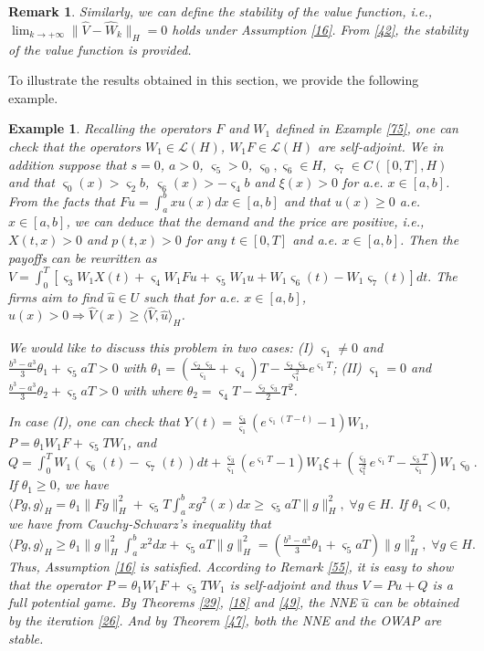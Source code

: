 \documentclass[10pt]{article}
\newtheorem{remark}{Remark}[section]
\newtheorem{example}{Example}[section]
\begin{document}
\begin{remark}\label{90}
Similarly, we can define the stability of the value function, i.e., $\lim_{k\rightarrow+\infty}\|\widehat{V}-\widehat{W}_k\|_H=0$ holds under Assumption \ref{16}. From \eqref{42}, the stability of the value function is provided.
\end{remark}
To illustrate  the results obtained in this section, we provide the following example.
\begin{example}\label{67}
Recalling the operators $F$ and $W_1$ defined in Example \ref{75}, one can check that the operators $W_1\in\mathcal{L}(H)$, $W_1F\in \mathcal{L}(H)$ are self-adjoint. We in addition suppose that $s=0$, $a>0$, $\varsigma_5>0$, $\varsigma_0,\varsigma_6\in H$, $\varsigma_7\in C([0,T],H)$ and that
$\varsigma_0(x)>\varsigma_2b$, $\varsigma_6(x)>-\varsigma_4b$  and $\xi(x)>0$ for a.e. $x\in[a,b]$.
From  the facts that $Fu=\int_a^bxu(x)dx\in[a,b]$ and that $u(x)\geq0$ a.e. $x\in[a,b]$, we can deduce that the demand and the price are positive, i.e.,
$X(t,x)>0$ and $p(t,x)>0$ for any  $t\in[0,T]$ and a.e.  $x\in[a,b]$. Then the payoffs can be rewritten as
$V=\int_0^T[\varsigma_3W_1X(t)+\varsigma_4W_1Fu+\varsigma_5W_1u+W_1\varsigma_6(t)-W_1\varsigma_7(t)]dt.$
The firms aim to find $\widehat{u} \in U$  such  that for a.e. $x\in[a,b]$, $\widehat{u}(x)>0\Rightarrow\widehat{V}(x)\geq\langle\widehat{V},\widehat{u}\rangle_{H}$.

We would like to discuss this problem in  two cases: (I) $\varsigma_1\neq0$ and $\frac{b^3-a^3}{3}\theta_1+\varsigma_5aT>0$ with $\theta_1=(\frac{\varsigma_2\varsigma_3}{\varsigma_1}+\varsigma_4)T-\frac{\varsigma_2\varsigma_3}{\varsigma^2_1}e^{\varsigma_1T}$;
(II) $\varsigma_1=0$ and $\frac{b^3-a^3}{3}\theta_2+\varsigma_5aT>0$ with where $\theta_2=\varsigma_4T-\frac{\varsigma_2\varsigma_3}{2}T^2$.

In  case (I), one can check that
$Y(t)=\frac{\varsigma_3}{\varsigma_1}(e^{\varsigma_1(T-t)}-1)W_1$, $P=\theta_1 W_1F+\varsigma_5TW_1$, and
$Q=\int_0^TW_1(\varsigma_6(t)-\varsigma_7(t))dt+\frac{\varsigma_3}{\varsigma_1}(e^{\varsigma_1T}-1)W_1\xi+(\frac{\varsigma_3}{\varsigma^2_1}e^{\varsigma_1T}-\frac{\varsigma_3T}{\varsigma_1})W_1\varsigma_0.$
If $\theta_1\geq0$, we have $\langle Pg,g\rangle_H=\theta_1\|Fg\|_H^2+\varsigma_5T\int_a^bxg^2(x)dx\geq \varsigma_5aT\|g\|_H^2,\; \forall g\in H.$
If $\theta_1<0$, we have from Cauchy-Schwarz's inequality that
$
\langle Pg,g\rangle_H\geq \theta_1\|g\|_H^2\int_a^bx^2dx+\varsigma_5aT\|g\|_H^2=(\frac{b^3-a^3}{3}\theta_1+\varsigma_5aT)\|g\|_H^2,\; \forall g\in H.
$
Thus, Assumption \ref{16} is satisfied. According to Remark \ref{55}, it is easy to show that the operator $P=\theta_1 W_1F+\varsigma_5TW_1$ is self-adjoint and thus $V=Pu+Q$ is a full potential game. By Theorems \ref{29}, \ref{18} and \ref{49}, the NNE $\widehat{u}$ can be obtained by the iteration \eqref{26}. And by Theorem \ref{47}, both the NNE  and the OWAP  are stable.


\end{example}
\end{document}
